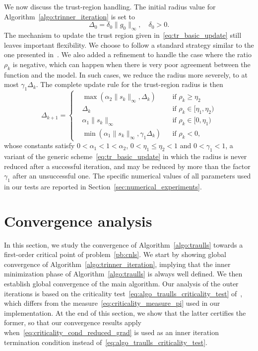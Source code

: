 \documentclass[pdflatex,sn-mathphys-num]{sn-jnl}%
\theoremstyle{thmstyleone}%
\begin{document}
We now discuss the trust-region handling. The initial radius value for Algorithm~\ref{algo:trinner_iteration} is set to
\begin{equation*}
	\Delta_0 = \delta_0 \| g_0\|_\infty, \quad \delta_0 > 0.
\end{equation*}
The mechanism to update the trust region given in~\eqref{eq:tr_basic_update} still leaves important flexibility. We choose to follow a standard strategy similar to the one presented in~\cite[Chapter~17]{conn-etal:2000}. We also added a refinement to handle the case where the ratio $\rho_k$ is negative, which can happen when there is very poor agreement between the function and the model. In such cases, we reduce the radius more severely, to at most $\gamma_1\Delta_k$. The complete update rule for the trust-region radius is then
\begin{equation*}
	\Delta_{k+1} = \left\{\begin{aligned}
		& \max\left(\alpha_2 \|s_k\|_\infty,\Delta_k\right) & &\text{if } \rho_k \ge \eta_2 \\
		& \Delta_k &  &\text{if } \rho_k \in [\eta_1,\eta_2) \\
		& \alpha_1\|s_k\|_\infty & &\text{if } \rho_k \in [0,\eta_1) \\
		& \min\left(\alpha_1 \|s_k\|_\infty,\gamma_1\Delta_k\right) & &\text{if } \rho_k < 0,
	\end{aligned}\right.
\end{equation*}
whose constants satisfy $0 < \alpha_1 < 1 < \alpha_2$, $0 < \eta_1 \le \eta_2 < 1$ and $0 < \gamma_1 < 1$, a variant of the generic scheme~\eqref{eq:tr_basic_update} in which the radius is never reduced after a successful iteration, and may be reduced by more than the factor $\gamma_1$ after an unsuccessful one. The specific numerical values of all parameters used in our tests are reported in Section~\ref{sec:numerical_experiments}.


\section{Convergence analysis}\label{sec:convergence_analysis}

In this section, we study the convergence of Algorithm~\ref{algo:traulls} towards a first-order critical point of problem~\eqref{pb:cnls}. We start by showing global convergence of Algorithm~\ref{algo:trinner_iteration}, implying that the inner minimization phase of Algorithm~\ref{algo:traulls} is always well defined. We then establish global convergence of the main algorithm. Our analysis of the outer iterations is based on the criticality test~\eqref{eq:algo_traulls_criticality_test} of~\cite{conn-etal:1996b}, which differs from the measure~\eqref{eq:criticality_measure_pi} used in our implementation. At the end of this section, we show that the latter certifies the former, so that our convergence results apply when~\eqref{eq:criticality_cond_reduced_grad} is used as an inner iteration termination condition instead of~\eqref{eq:algo_traulls_criticality_test}.
\end{document}
